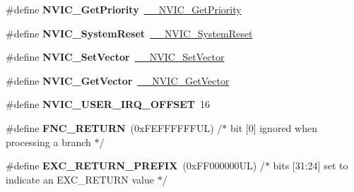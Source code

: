 \begin{DoxyCompactItemize}
\#define {\bfseries N\+V\+I\+C\+\_\+\+Get\+Priority}~\mbox{\hyperlink{group___c_m_s_i_s___core___n_v_i_c_functions_gaeb9dc99c8e7700668813144261b0bc73}{\+\_\+\+\_\+\+N\+V\+I\+C\+\_\+\+Get\+Priority}}
\item 
\mbox{\label{group___c_m_s_i_s___core___n_v_i_c_functions_ga6aa0367d3642575610476bf0366f0c48}} 
\#define {\bfseries N\+V\+I\+C\+\_\+\+System\+Reset}~\mbox{\hyperlink{group___c_m_s_i_s___core___n_v_i_c_functions_ga0d9aa2d30fa54b41eb780c16e35b676c}{\+\_\+\+\_\+\+N\+V\+I\+C\+\_\+\+System\+Reset}}
\item 
\mbox{\label{group___c_m_s_i_s___core___n_v_i_c_functions_ga804af63bb4c4c317387897431814775d}} 
\#define {\bfseries N\+V\+I\+C\+\_\+\+Set\+Vector}~\mbox{\hyperlink{group___c_m_s_i_s___core___n_v_i_c_functions_ga0df355460bc1783d58f9d72ee4884208}{\+\_\+\+\_\+\+N\+V\+I\+C\+\_\+\+Set\+Vector}}
\item 
\mbox{\label{group___c_m_s_i_s___core___n_v_i_c_functions_ga955eb1c33a3dcc62af11a8385e8c0fc8}} 
\#define {\bfseries N\+V\+I\+C\+\_\+\+Get\+Vector}~\mbox{\hyperlink{group___c_m_s_i_s___core___n_v_i_c_functions_ga44b665d2afb708121d9b10c76ff00ee5}{\+\_\+\+\_\+\+N\+V\+I\+C\+\_\+\+Get\+Vector}}
\item 
\mbox{\label{group___c_m_s_i_s___core___n_v_i_c_functions_ga8045d905a5ca57437d8e6f71ffcb6df5}} 
\#define {\bfseries N\+V\+I\+C\+\_\+\+U\+S\+E\+R\+\_\+\+I\+R\+Q\+\_\+\+O\+F\+F\+S\+ET}~16
\item 
\mbox{\label{group___c_m_s_i_s___core___n_v_i_c_functions_gabaa62910bf89acc186ae998c611e64ab}} 
\#define {\bfseries F\+N\+C\+\_\+\+R\+E\+T\+U\+RN}~(0x\+F\+E\+F\+F\+F\+F\+F\+F\+U\+L)     /$\ast$ bit \mbox{[}0\mbox{]} ignored when processing a branch                             $\ast$/
\item 
\mbox{\label{group___c_m_s_i_s___core___n_v_i_c_functions_ga99e0c1c19f050880a8bd827a7f420bec}} 
\#define {\bfseries E\+X\+C\+\_\+\+R\+E\+T\+U\+R\+N\+\_\+\+P\+R\+E\+F\+IX}~(0x\+F\+F000000\+U\+L)     /$\ast$ bits \mbox{[}31\+:24\mbox{]} set to indicate an E\+X\+C\+\_\+\+R\+E\+T\+U\+R\+N value                     $\ast$/

\end{DoxyCompactItemize}

